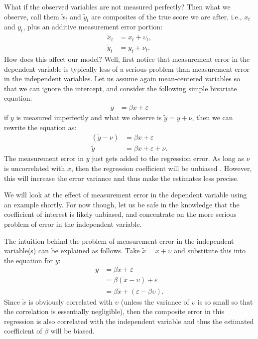 \documentclass[]{interact}
\theoremstyle{plain}%
\theoremstyle{definition}
\theoremstyle{remark}
\begin{document}
What if the observed variables are not measured perfectly? Then what we
observe, call them \(\tilde{x}_{t}\) and \(\tilde{y}_{t}\) are
composites of the true score we are after, i.e., \(x_{t}\) and
\(y_{t}\), plus an additive measurement error portion: \begin{align}
\tilde{x}_{t} & = x_{t} + \upsilon_{t}, \\
\tilde{y}_{t} & = y_{t} + \nu_{t}.
\end{align} How does this affect our model? Well, first notice that
measurement error in the dependent variable is typically less of a
serious problem than measurement error in the independent variables. Let
us assume again mean-centered variables so that we can ignore the
intercept, and consider the following simple bivariate equation:
\begin{align}
y & = \beta x + \varepsilon
\end{align} if \(y\) is measured imperfectly and what we observe is
\(\tilde{y} = y + \nu\), then we can rewrite the equation as:
\begin{align}
(\tilde{y} - \nu) & = \beta x + \varepsilon \\
\tilde{y} & = \beta x + \varepsilon + \nu.
\end{align} The measurement error in \(y\) just gets added to the
regression error. As long as \(\nu\) is uncorrelated with \(x\), then
the regression coefficient will be unbiased
\citep{Pischke2007, Wooldridge2009}. However, this will increase the
error variance and thus make the estimates less precise.

We will look at the effect of measurement error in the dependent
variable using an example shortly. For now though, let us be safe in the
knowledge that the coefficient of interest is likely unbiased, and
concentrate on the more serious problem of error in the independent
variable.

The intuition behind the problem of measurement error in the independent
variable(s) can be explained as follows. Take
\(\tilde{x} = x + \upsilon\) and substitute this into the equation for
\(y\): \begin{align}
y & = \beta x + \varepsilon \\
 & = \beta(\tilde{x} - \upsilon) + \varepsilon \\
 & = \beta\tilde{x} + (\varepsilon - \beta\upsilon).
\end{align} Since \(\tilde{x}\) is obviously correlated with
\(\upsilon\) (unless the variance of \(\upsilon\) is so small so that
the correlation is essentially negligible), then the composite error in
this regression is also correlated with the independent variable and
thus the estimated coefficient of \(\beta\) will be biased.
\end{document}
